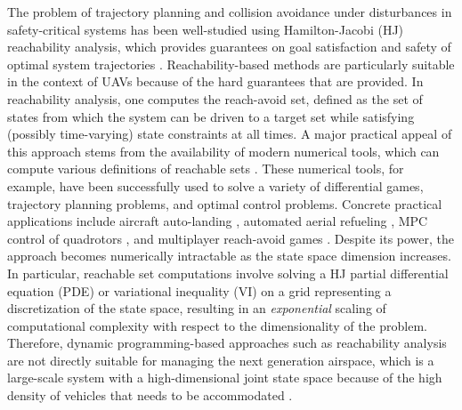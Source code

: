 The problem of trajectory planning and collision avoidance under disturbances in safety-critical systems has been well-studied using Hamilton-Jacobi (HJ) reachability analysis, which provides guarantees on goal satisfaction and safety of optimal system trajectories \cite{Barron90, Mitchell05, Bokanowski10, Bokanowski11, Margellos11, Fisac15}. Reachability-based methods are particularly suitable in the context of UAVs because of the hard guarantees that are provided. In reachability analysis, one computes the reach-avoid set, defined as the set of states from which the system can be driven to a target set while satisfying (possibly time-varying) state constraints at all times. A major practical appeal of this approach stems from the availability of modern numerical tools, which can compute various definitions of reachable sets \cite{Sethian96, Osher02, Mitchell02, Mitchell07b}. These numerical tools, for example, have been successfully used to solve a variety of differential games, trajectory planning problems, and optimal control problems. Concrete practical applications include aircraft auto-landing \cite{Bayen07}, automated aerial refueling \cite{Ding08}, MPC control of quadrotors \cite{Bouffard12}, and multiplayer reach-avoid games \cite{Huang11}. Despite its power, the approach becomes numerically intractable as the state space dimension increases. In particular, reachable set computations involve solving a HJ partial differential equation (PDE) or variational inequality (VI) on a grid representing a discretization of the state space, resulting in an \textit{exponential} scaling of computational complexity with respect to the dimensionality of the problem. Therefore, dynamic programming-based approaches such as reachability analysis are not directly suitable for managing the next generation airspace, which is a large-scale system with a high-dimensional joint state space because of the high density of vehicles that needs to be accommodated \cite{Kopardekar16}.  

